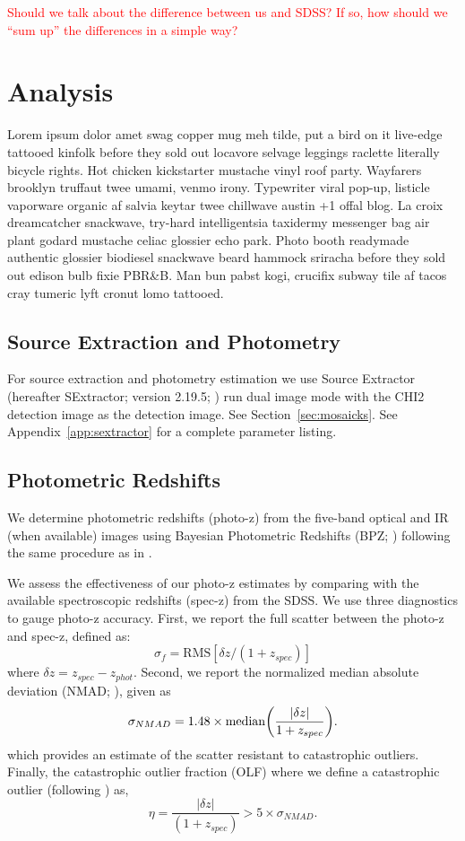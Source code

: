 \documentclass[apj, revtex4]{emulateapj}
\newcommand{\editorial}[1]{\textcolor{red}{#1}}
\begin{document}
\editorial{Should we talk about the difference between us and SDSS? If so, how should we ``sum up'' the differences in a simple way?} 

\section{Analysis}\label{sec:analysis}
Lorem ipsum dolor amet swag copper mug meh tilde, put a bird on it live-edge tattooed kinfolk before they sold out locavore selvage leggings raclette literally bicycle rights. Hot chicken kickstarter mustache vinyl roof party. Wayfarers brooklyn truffaut twee umami, venmo irony. Typewriter viral pop-up, listicle vaporware organic af salvia keytar twee chillwave austin +1 offal blog. La croix dreamcatcher snackwave, try-hard intelligentsia taxidermy messenger bag air plant godard mustache celiac glossier echo park. Photo booth readymade authentic glossier biodiesel snackwave beard hammock sriracha before they sold out edison bulb fixie PBR\&B. Man bun pabst kogi, crucifix subway tile af tacos cray tumeric lyft cronut lomo tattooed.

\subsection{Source Extraction and Photometry}
For source extraction and photometry estimation we use Source Extractor (hereafter SExtractor; version 2.19.5; \citealt{Bertin1996}) run dual image mode with the CHI2 detection image as the detection image. See Section~\ref{sec:mosaicks}. See Appendix~\ref{app:sextractor} for a complete parameter listing.

\subsection{Photometric Redshifts}
We determine photometric redshifts (photo-z) from the five-band optical and IR (when available) images using Bayesian Photometric Redshifts (BPZ; \citealt{Benitez2000, Coe2006}) following the same procedure as in \cite{Menanteau2009a}.

We assess the effectiveness of our photo-z estimates by comparing with the available spectroscopic redshifts (spec-z) from the SDSS. We use three diagnostics to gauge photo-z accuracy. First, we report the full scatter between the photo-z and spec-z, defined as:
\begin{equation}
	\sigma_f = \mathrm{RMS}[\delta z/(1+z_{spec})]
\end{equation}
where $\delta z = z_{spec} - z_{phot}$. Second, we report the normalized median absolute deviation (NMAD; \citealt{Ilbert2009, Dahlen2013, Molino2017}), given as
\begin{equation}
	\sigma_{NMAD} = 1.48 \times \mathrm{median} \bigg{(} \frac{|\delta z|}{1+z_{spec}} \bigg{)}.
\end{equation}   
which provides an estimate of the scatter resistant to catastrophic outliers. Finally, the catastrophic outlier fraction (OLF) where we define a catastrophic outlier (following \citealt{Molino2017}) as,
\begin{equation}
	\eta = \frac{|\delta z|}{(1+z_{spec})} > 5 \times \sigma_{NMAD}.
\end{equation}
\end{document}
